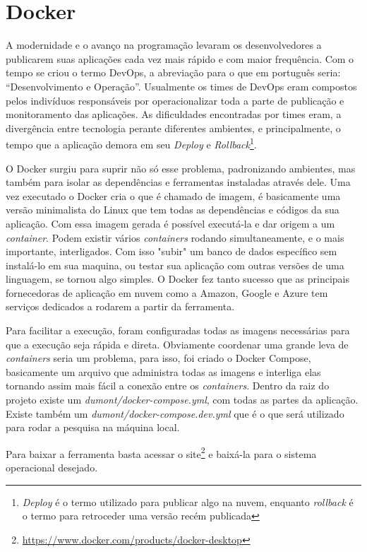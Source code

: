 \chapter{Docker}
\label{app:docker}

A modernidade e o avanço na programação levaram os desenvolvedores a publicarem suas aplicações cada vez mais rápido e com maior frequência. Com o tempo se criou o termo DevOps, a abreviação para o que em português seria: “Desenvolvimento e Operação”. Usualmente os times de DevOps eram compostos pelos indivíduos responsáveis por operacionalizar toda a parte de publicação e monitoramento das aplicações. As dificuldades encontradas por times eram, a divergência entre tecnologia perante diferentes ambientes, e principalmente, o tempo que a aplicação demora em seu \textit{Deploy} e \textit{Rollback}\footnote{\textit{Deploy} é o termo utilizado para publicar algo na nuvem, enquanto \textit{rollback} é o termo para retroceder uma versão recém publicada}.

O Docker surgiu para suprir não só esse problema, padronizando ambientes, mas também para isolar as dependências e ferramentas instaladas através dele. Uma vez executado o Docker cria o que é chamado de imagem, é basicamente uma versão minimalista do Linux que tem todas as dependências e códigos da sua aplicação. Com essa imagem gerada é possível executá-la e dar origem a um \textit{container}. Podem existir vários \textit{containers} rodando simultaneamente, e o mais importante, interligados. Com isso "subir" um banco de dados específico sem instalá-lo em sua maquina, ou testar sua aplicação com outras versões de uma linguagem, se tornou algo simples. O Docker fez tanto sucesso que as principais fornecedoras de aplicação em nuvem como a Amazon, Google e Azure tem serviços dedicados a rodarem a partir da ferramenta.

Para facilitar a execução, foram configuradas todas as imagens necessárias para que a execução seja rápida e direta. Obviamente coordenar uma grande leva de \textit{containers} seria um problema, para isso, foi criado o Docker Compose, basicamente um arquivo que administra todas as imagens e interliga elas tornando assim mais fácil a conexão entre os \textit{containers}. Dentro da raiz do projeto existe um \textit{dumont/docker-compose.yml}, com todas as partes da aplicação. Existe também um \textit{dumont/docker-compose.dev.yml} que é o que será utilizado para rodar a pesquisa na máquina local.

Para baixar a ferramenta basta acessar o site\footnote{\url{https://www.docker.com/products/docker-desktop}} e baixá-la para o sistema operacional desejado.


